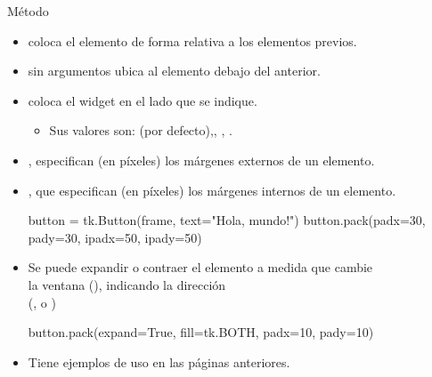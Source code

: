 \documentclass[10pt, envcountsect , spanish]{beamer}
\begin{document}
\begin{frame}[fragile, label=pack]{Método }

\begin{itemize} 
\item  {} coloca el elemento de forma relativa a los elementos previos.
\item  {} sin argumentos ubica al elemento debajo del anterior.
\item {} coloca el widget en el lado que se indique. 
	\begin{itemize}
	\item Sus valores son:  (por defecto),, , .
	\end{itemize}
\item {},  especifican (en píxeles) los márgenes externos de un elemento.
\item {},   que especifican (en píxeles) los márgenes internos de un elemento.

\small
\begin{minipage}{.70\textwidth}
\begin{pyverbatim}[][frame=single]
button = tk.Button(frame, text="Hola, mundo!")
button.pack(padx=30, pady=30, ipadx=50, ipady=50)
\end{pyverbatim}
\end{minipage}
\normalsize

\item Se puede expandir o contraer el elemento a medida que cambie\\
la ventana (), indicando la dirección \\
(,  o )

\small
\begin{minipage}{.70\textwidth}
\begin{pyverbatim}[][frame=single]
button.pack(expand=True, fill=tk.BOTH, 
                    padx=10, pady=10)
\end{pyverbatim}
\end{minipage}
\normalsize

\item Tiene ejemplos de uso en las páginas anteriores.

\end{itemize}



\end{frame}
\end{document}
